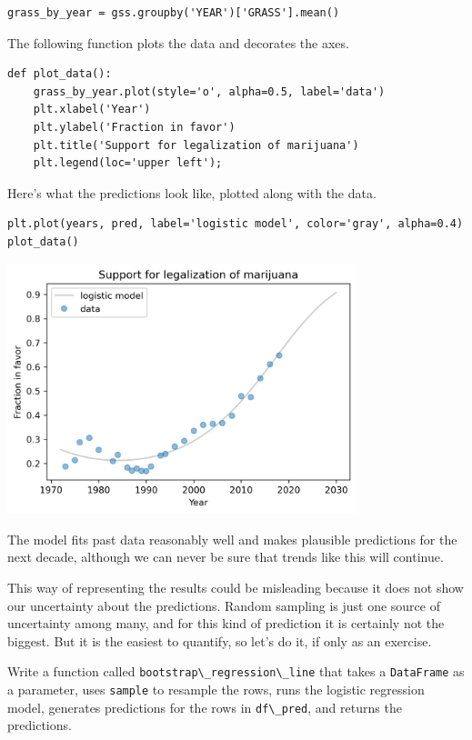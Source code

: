 \begin{lstlisting}[]
grass_by_year = gss.groupby('YEAR')['GRASS'].mean()
\end{lstlisting}

The following function plots the data and decorates the axes.

\begin{lstlisting}[]
def plot_data():
    grass_by_year.plot(style='o', alpha=0.5, label='data')
    plt.xlabel('Year')
    plt.ylabel('Fraction in favor')
    plt.title('Support for legalization of marijuana')
    plt.legend(loc='upper left');
\end{lstlisting}

Here's what the predictions look like, plotted along with the data.

\begin{lstlisting}[]
plt.plot(years, pred, label='logistic model', color='gray', alpha=0.4)
plot_data()
\end{lstlisting}

\begin{center}
\includegraphics[width=4in]{chapters/12_bootstrap_files/12_bootstrap_143_0.png}
\end{center}

The model fits past data reasonably well and makes plausible predictions
for the next decade, although we can never be sure that trends like this
will continue.

This way of representing the results could be misleading because it does
not show our uncertainty about the predictions. Random sampling is just
one source of uncertainty among many, and for this kind of prediction it
is certainly not the biggest. But it is the easiest to quantify, so
let's do it, if only as an exercise.

Write a function called
\passthrough{\lstinline!bootstrap\_regression\_line!} that takes a
\passthrough{\lstinline!DataFrame!} as a parameter, uses
\passthrough{\lstinline!sample!} to resample the rows, runs the logistic
regression model, generates predictions for the rows in
\passthrough{\lstinline!df\_pred!}, and returns the predictions.

